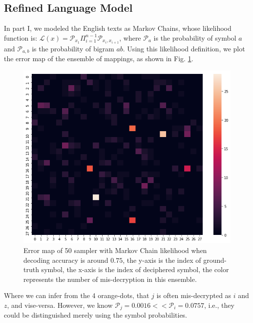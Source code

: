 \documentclass[10pt, twocolumn]{article}
\begin{document}
\subsection{\label{subsec2.2}Refined Language Model}
In part I, we modeled the English texts as Markov Chains, whose likelihood function is: $\mathcal{L}(x) = \mathcal{P}_{x_1}\Pi_{i=1}^{n-1}\mathcal{P}_{x_i, x_{i+1}}$, where $\mathcal{P}_{a}$ is the probability of symbol $a$ and $\mathcal{P}_{a, b}$ is the probability of bigram $ab$. Using this likelihood definition, we plot the error map of the ensemble of mappings, as shown in Fig. \ref{fig:error_map_mc}.
\begin{figure}[t]
	\centering
	\includegraphics[width=0.9\linewidth]{pics/error_map_mc.png}
	\caption{Error map of 50 sampler with Markov Chain likelihood when decoding accuracy is around $0.75$, the y-axis is the index of ground-truth symbol, the x-axis is the index of deciphered symbol, the color represents the number of mis-decryption in this ensemble.}
	\label{fig:error_map_mc}
\end{figure}
Where we can infer from the 4 orange-dots, that $j$ is often mis-decrypted as $i$ and $z$, and vise-versa. However, we know $\mathcal{P}_{j}=0.0016<<\mathcal{P}_{i}=0.0757$, i.e., they could be distinguished merely using the symbol probabilities.
\end{document}
